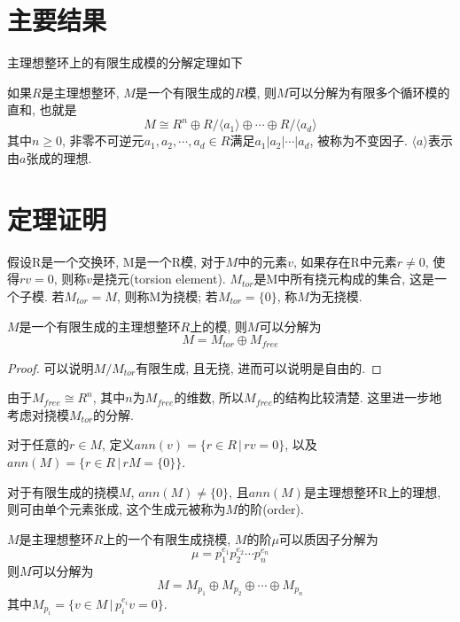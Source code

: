 \section{主要结果}
主理想整环上的有限生成模的分解定理如下
\begin{theorem}
如果$R$是主理想整环, $M$是一个有限生成的$R$模, 则$M$可以分解为有限多个循环模的直和, 
也就是
\begin{equation}
M \cong R^n \oplus R/\langle a_1 \rangle \oplus \cdots 
\oplus R/\langle a_d \rangle
\label{equ:decomp_0}
\end{equation}
其中$n\ge 0$, 非零不可逆元$a_1,a_2,\cdots, a_d \in R$满足$a_1|a_2|\cdots |a_d$,
被称为不变因子. $\langle a \rangle$表示由$a$张成的理想.
\end{theorem}

\section{定理证明}
\begin{definition}
	假设R是一个交换环, M是一个R模, 对于$M$中的元素$v$, 如果存在R中元素$r \ne 0$,
	使得$rv = 0$, 则称$v$是挠元(torsion element). 
	$M_{tor}$是M中所有挠元构成的集合, 这是一个子模.
	若$M_{tor} = M$, 则称M为挠模; 若$M_{tor}=\{0\}$, 称$M$为无挠模.
\end{definition}

\begin{theorem}
	$M$是一个有限生成的主理想整环$R$上的模, 则$M$可以分解为
	\begin{equation}
	M = M_{tor} \oplus M_{free}
	\label{equ:decom_1}
	\end{equation}
\end{theorem}
\begin{proof}
	可以说明$M/M_{tor}$有限生成, 且无挠, 进而可以说明是自由的.
\end{proof}

由于$M_{free} \cong R^n$, 其中$n$为$M_{free}$的维数, 
所以$M_{free}$的结构比较清楚. 
这里进一步地考虑对挠模$M_{tor}$的分解.

\begin{definition}
对于任意的$r \in M$, 定义$ann(v) = \{r\in R\,|\, rv = 0\}$,
以及$ann(M) = \{r\in R \,|\, rM = \{0\}\}$.
\end{definition}
对于有限生成的挠模$M$, $ann(M) \ne \{0\}$,
且$ann(M)$是主理想整环R上的理想, 则可由单个元素张成, 
这个生成元被称为$M$的阶(order).

\begin{theorem}
	$M$是主理想整环$R$上的一个有限生成挠模, 
	$M$的阶$\mu$可以质因子分解为
	$$\mu = p_1^{e_1}p_2^{e_2}\cdots p_n^{e_n}$$
	则$M$可以分解为
	\begin{equation}
	M = M_{p_1} \oplus M_{p_2} \oplus \cdots \oplus M_{p_n}
	\label{equ:decom_2}
	\end{equation}
	其中$M_{p_i} = \{v\in M\, |\, p_i^{e_i} v = 0\}$.
\end{theorem}

